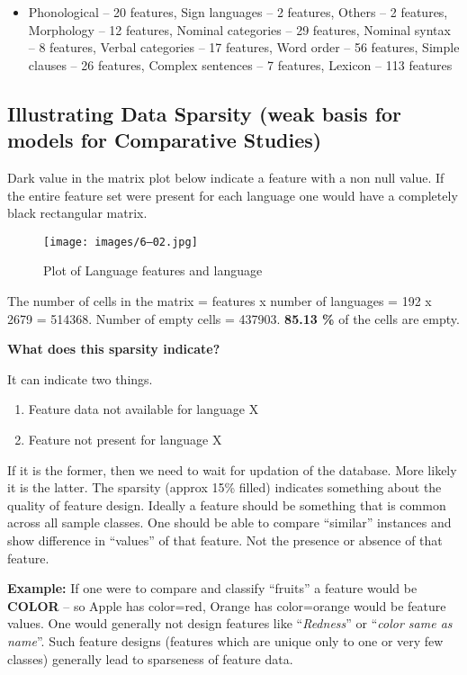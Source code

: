\begin{itemize}
\item Phonological – 20 features, Sign languages – 2 features, Others – 2 features, Morphology – 12 features, Nominal categories – 29 features, Nominal syntax – 8 features, Verbal categories – 17 features, Word order – 56 features, Simple clauses – 26 features, Complex sentences – 7 features, Lexicon – 113 features

\end{itemize}


\subsection*{Illustrating Data Sparsity (weak basis for models for Comparative Studies)}

Dark value in the matrix plot below indicate a feature with a non null value. If the entire feature set were present for each language one would have a completely black rectangular matrix.

\begin{figure}[!hbp]
\texttt{[image: images/6–02.jpg]}
\caption{Plot of Language features and language}\label{art6-fig02}
\end{figure}

The number of cells in the matrix = features x number of languages = 192 x 2679 = 514368. Number of empty cells = 437903. \textbf{85.13 \%} of the cells are empty.

\textbf{What does this sparsity indicate?}

It can indicate two things.

\begin{enumerate}[{\rm 1)}]
\itemsep=0pt
\item Feature data not available for language X

 \item Feature not present for language X

\end{enumerate}

If it is the former, then we need to wait for updation of the database. More likely it is the latter. The sparsity (approx 15\% filled) indicates something about the quality of feature design. Ideally a feature should be something that is common across all sample classes. One should be able to compare “similar” instances and show difference in “values” of that feature. Not the presence or absence of that feature.

\begin{myquote}
\textbf{Example:} If one were to compare and classify “fruits” a feature would be \textbf{COLOR} – so Apple has {color=red}, Orange has {color=orange} would be feature values. One would generally not design features like “\textit{Redness}” or “\textit{color same as name}”. Such feature designs (features which are unique only to one or very few classes) generally lead to sparseness of feature data.
\end{myquote}

